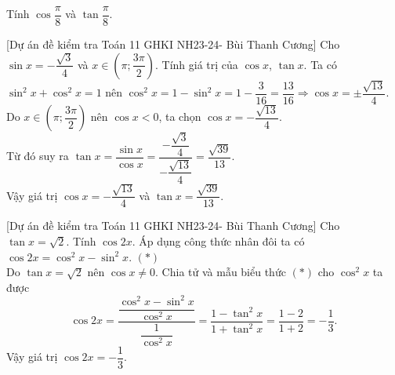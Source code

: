 \begin{bt}%
	Tính $\cos \dfrac{\pi}{8}$ và $\tan \dfrac{\pi}{8}$.
\end{bt}

\begin{bt}%
[Dự án đề kiểm tra Toán 11 GHKI NH23-24- Bùi Thanh Cương]%
	Cho $\sin x=-\dfrac{\sqrt{3}}{4}$ và $x \in\left(\pi ; \dfrac{3 \pi}{2}\right)$. Tính giá trị của $\cos x$, $\tan x$.
	\loigiai
	{Ta có $\sin^2x+\cos^2x=1$ nên $\cos^2x=1-\sin^2x=1-\dfrac{3}{16}=\dfrac{13}{16}\Rightarrow \cos x=\pm\dfrac{\sqrt{13}}{4}$.\\
		Do $x\in\left(\pi; \dfrac{3\pi}{2}\right)$ nên $\cos x<0$, ta chọn $\cos x=-\dfrac{\sqrt{13}}{4}$.\\
		Từ đó suy ra 
		$\tan x =\dfrac{\sin x }{\cos x}=\dfrac{-\dfrac{\sqrt{3}}{4}}{-\dfrac{\sqrt{13}}{4}}=\dfrac{\sqrt{39}}{13}$.\\
		Vậy giá trị  $\cos x= -\dfrac{\sqrt{13}}{4}$ và $\tan x=\dfrac{\sqrt{39}}{13}$.
	}
\end{bt}

\begin{bt}%
[Dự án đề kiểm tra Toán 11 GHKI NH23-24- Bùi Thanh Cương]%
	Cho $\tan x=\sqrt{2}$. Tính $\cos 2x$.
	\loigiai
	{Áp dụng công thức nhân đôi ta có $\cos 2x=\cos^2x-\sin^2x$. \hfill $(*)$\\
		Do $\tan x=\sqrt{2}$ nên $\cos x\neq 0$. Chia tử và mẫu biểu thức $(*)$ cho $\cos^2x$ ta được
		\[ \cos 2x=\dfrac{\dfrac{\cos^2x-\sin^2x}{\cos^2x}}{\dfrac{1}{\cos^2 x}}=\dfrac{1-\tan^2x}{1+\tan^2 x}=\dfrac{1-2}{1+2}=-\dfrac{1}{3}.\]  
		Vậy giá trị $\cos 2x=-\dfrac{1}{3}$.
	}
\end{bt}


